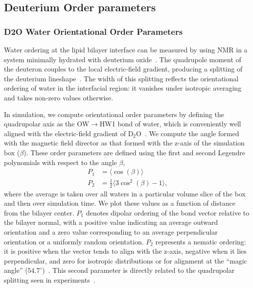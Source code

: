 \subsection{Deuterium Order parameters}
\subsubsection{D2O Water Orientational Order Parameters}
Water ordering at the lipid bilayer interface can be measured by using NMR in a system minimally hydrated with deuterium oxide~\cite{aaman:2003}.
The quadrupole moment of the deuteron couples to the local electric-field gradient, producing a splitting of the deuterium lineshape~\cite{seelig:1977}.
The width of this splitting reflects the orientational ordering of water in the interfacial region: it vanishes under isotropic averaging and takes non-zero values otherwise.

In simulation, we compute orientational order parameters by defining the quadrupolar axis as the
OW$\rightarrow$HW1 bond of water, which is conveniently well aligned with the electric-field gradient of D$_2$O~\cite{aaman:2003}.
We compute the angle formed with the magnetic field director as that formed with the z-axis of the simulation box ($\beta$). 
These order parameters are defined using the first and second Legendre polynomials with respect to the angle $\beta$,
\begin{equation}
    \begin{split}
    P_1&=\langle \cos\left(\beta\right) \rangle \\
    P_2&=\tfrac{1}{2}\big\langle 3\cos^2\left(\beta\right)-1 \big\rangle
    \text{,}
\end{split}
\end{equation}
where the average is taken over all waters in a particular volume slice of the box and then over simulation time.  
We plot these values as a function of distance from the bilayer center. 
$P_1$ denotes dipolar ordering of the bond vector relative to the bilayer normal, with a positive value indicating an average outward orientation and a zero value corresponding to an average perpendicular orientation or a uniformly random orientation. 
$P_2$ represents a nematic ordering: it is positive when the vector tends to align with the z-axis, negative when it lies perpendicular, and zero for isotropic distributions or for alignment at the ``magic angle'' ($54.7^{\circ}$)~\cite{seelig:1977}. 
This second parameter is directly related to the quadrupolar splitting seen in experiments~\cite{aaman:2003,kruczek:2017:ether,saunders:2019}.

